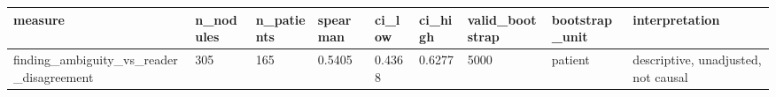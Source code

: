 \begin{tabular}{lllllllll}
\hline
measure & n\_nodules & n\_patients & spearman & ci\_low & ci\_high & valid\_bootstrap & bootstrap\_unit & interpretation \\
\hline
finding\_ambiguity\_vs\_reader\_disagreement & 305 & 165 & 0.5405 & 0.4368 & 0.6277 & 5000 & patient & descriptive, unadjusted, not causal \\
\hline
\end{tabular}
